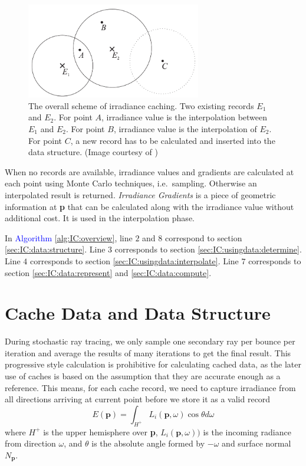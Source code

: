 \documentclass[]{book}
\begin{document}
\begin{figure}[b]
	\centering
	\includegraphics[width=3.0in]{img/IC-overview.png}
	\caption[Irradiance Caching]{The overall scheme of irradiance caching. Two existing records $E_1$ and $E_2$. For point $A$, irradiance value is the interpolation between $E_1$ and $E_2$. For point $B$, irradiance value is the interpolation of $E_2$. For point $C$, a new record has to be calculated and inserted into the data structure. (Image courtesy of \citeauthor{ward1988IC})}
	\label{fig:IC:overview}
\end{figure}

When no records are available, irradiance values and gradients are calculated at each point using Monte Carlo techniques, i.e.\ sampling.
Otherwise an interpolated result is returned.
\textit{Irradiance Gradients} \cite{ward1992irradiance} is a piece of geometric information at \textbf{p} that can be calculated along with the irradiance value without additional cost.
It is used in the interpolation phase.

In \textcolor{blue}{Algorithm \ref{alg:IC:overview}}, line $2$ and $8$ correspond to section \ref{sec:IC:data:structure}.
Line $3$ corresponds to section \ref{sec:IC:usingdata:determine}.
Line $4$ corresponds to section \ref{sec:IC:usingdata:interpolate}.
Line $7$ corresponds to section \ref{sec:IC:data:represent} and \ref{sec:IC:data:compute}.

\section{Cache Data and Data Structure}
\label{sec:IC:data}
During stochastic ray tracing, we only sample one secondary ray per bounce per iteration and average the results of many iterations to get the final result.
This progressive style calculation is prohibitive for calculating cached data, as the later use of caches is based on the assumption that they are accurate enough as a reference.
This means, for each cache record, we need to capture irradiance from all directions arriving at current point before we store it as a valid record
\begin{equation}
\label{eq:IC:irradiance}
E(\textbf{p}) = \int_{H^+} L_i(\textbf{p}, \omega) \cos\theta d\omega
\end{equation}
where $H^+$ is the upper hemisphere over \textbf{p}, $L_i(\textbf{p}, \omega))$ is the incoming radiance from direction $\omega$, and $\theta$ is the absolute angle formed by $-\omega$ and surface normal $N_{\textbf{p}}$.
\end{document}
